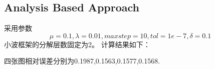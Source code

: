 \documentclass[a4paper,  11pt]{ctexart}
\begin{document}
\subsection{Analysis Based Approach}
采用参数
\[
   \mu = 0.1, \lambda = 0.01, maxstep = 10, tol = 1e-7, \delta = 0.1 
\]
小波框架的分解层数固定为2。
计算结果如下：
\begin{figure}[H]
  \end{figure}
四张图相对误差分别为0.1987,0.1563,0.1577,0.1568.
\end{document}
